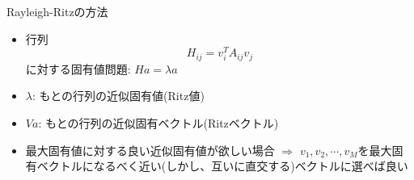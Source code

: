 \begin{frame}[t,fragile]{Rayleigh-Ritzの方法}
  \begin{itemize}
    \setlength{\itemsep}{1em}
  \item 行列
    \[
    H_{ij} = v_i^T A_{ij} v_j
    \]
    に対する固有値問題: $H a = \lambda a$
  \item $\lambda$: もとの行列の近似固有値(Ritz値)
  \item $Va$: もとの行列の近似固有ベクトル(Ritzベクトル)
  \item 最大固有値に対する良い近似固有値が欲しい場合 $\Rightarrow$ $v_1,v_2,\cdots,v_M$を最大固有ベクトルになるべく近い(しかし、互いに直交する)ベクトルに選べば良い
  \end{itemize}
\end{frame}
